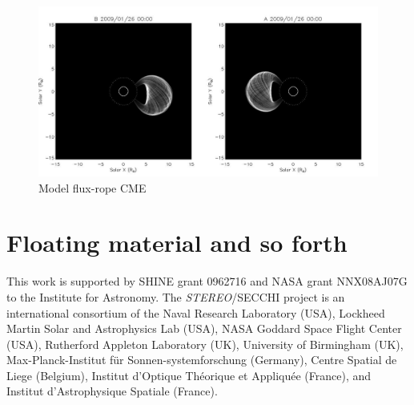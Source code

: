 \documentclass[preprint2]{aastex}
\begin{document}
\begin{figure}[ht]
\includegraphics[scale=0.2, trim=0 0 0 0, clip=true]{images/fluxropemodel.jpg}
\caption{Model flux-rope CME}
\label{fluxropemodel}
\end{figure}

\section{Floating material and so forth}


\acknowledgments

This work is supported by SHINE grant 0962716 and NASA grant NNX08AJ07G to the Institute for Astronomy. %
The \emph{STEREO}/SECCHI project is an international consortium of the Naval Research Laboratory (USA), Lockheed Martin Solar and Astrophysics Lab (USA), NASA Goddard Space Flight Center (USA), Rutherford Appleton Laboratory (UK), University of Birmingham (UK), Max-Planck-Institut f\"{u}r Sonnen-systemforschung (Germany), Centre Spatial de Liege (Belgium), Institut d'Optique Th\'{e}orique et Appliqu\'{e}e (France), and Institut d'Astrophysique Spatiale (France).




  
\end{document}
